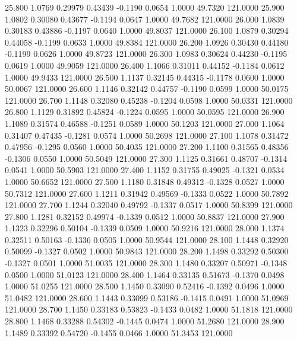   25.800   1.0769   0.29979   0.43439  -0.1190   0.0654   1.0000  49.7320 121.0000
  25.900   1.0802   0.30080   0.43677  -0.1194   0.0647   1.0000  49.7682 121.0000
  26.000   1.0839   0.30183   0.43886  -0.1197   0.0640   1.0000  49.8037 121.0000
  26.100   1.0879   0.30294   0.44058  -0.1199   0.0633   1.0000  49.8384 121.0000
  26.200   1.0926   0.30430   0.44180  -0.1199   0.0626   1.0000  49.8723 121.0000
  26.300   1.0983   0.30624   0.44230  -0.1195   0.0619   1.0000  49.9059 121.0000
  26.400   1.1066   0.31011   0.44152  -0.1184   0.0612   1.0000  49.9433 121.0000
  26.500   1.1137   0.32145   0.44315  -0.1178   0.0600   1.0000  50.0067 121.0000
  26.600   1.1146   0.32142   0.44757  -0.1190   0.0599   1.0000  50.0175 121.0000
  26.700   1.1148   0.32080   0.45238  -0.1204   0.0598   1.0000  50.0331 121.0000
  26.800   1.1129   0.31892   0.45824  -0.1224   0.0595   1.0000  50.0595 121.0000
  26.900   1.1089   0.31574   0.46588  -0.1251   0.0589   1.0000  50.1203 121.0000
  27.000   1.1064   0.31407   0.47435  -0.1281   0.0574   1.0000  50.2698 121.0000
  27.100   1.1078   0.31472   0.47956  -0.1295   0.0560   1.0000  50.4035 121.0000
  27.200   1.1100   0.31565   0.48356  -0.1306   0.0550   1.0000  50.5049 121.0000
  27.300   1.1125   0.31661   0.48707  -0.1314   0.0541   1.0000  50.5903 121.0000
  27.400   1.1152   0.31755   0.49025  -0.1321   0.0534   1.0000  50.6652 121.0000
  27.500   1.1180   0.31848   0.49312  -0.1328   0.0527   1.0000  50.7312 121.0000
  27.600   1.1211   0.31942   0.49569  -0.1333   0.0522   1.0000  50.7892 121.0000
  27.700   1.1244   0.32040   0.49792  -0.1337   0.0517   1.0000  50.8399 121.0000
  27.800   1.1281   0.32152   0.49974  -0.1339   0.0512   1.0000  50.8837 121.0000
  27.900   1.1323   0.32296   0.50104  -0.1339   0.0509   1.0000  50.9216 121.0000
  28.000   1.1374   0.32511   0.50163  -0.1336   0.0505   1.0000  50.9544 121.0000
  28.100   1.1448   0.32920   0.50099  -0.1327   0.0502   1.0000  50.9843 121.0000
  28.200   1.1498   0.33292   0.50300  -0.1327   0.0501   1.0000  51.0035 121.0000
  28.300   1.1480   0.33207   0.50971  -0.1348   0.0500   1.0000  51.0123 121.0000
  28.400   1.1464   0.33135   0.51673  -0.1370   0.0498   1.0000  51.0255 121.0000
  28.500   1.1450   0.33090   0.52416  -0.1392   0.0496   1.0000  51.0482 121.0000
  28.600   1.1443   0.33099   0.53186  -0.1415   0.0491   1.0000  51.0969 121.0000
  28.700   1.1450   0.33183   0.53823  -0.1433   0.0482   1.0000  51.1818 121.0000
  28.800   1.1468   0.33288   0.54302  -0.1445   0.0474   1.0000  51.2680 121.0000
  28.900   1.1489   0.33392   0.54720  -0.1455   0.0466   1.0000  51.3453 121.0000
